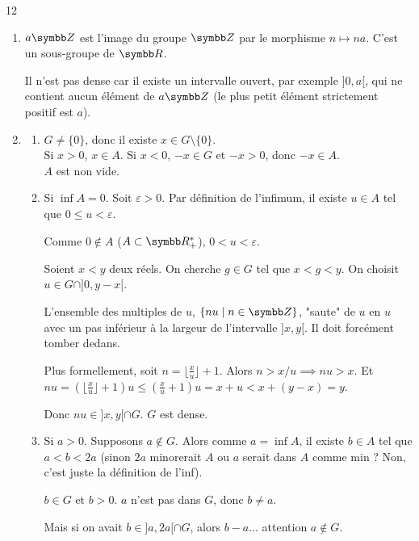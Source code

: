 \begin{correction}{12}
\begin{enumerate}
    \item $a\Z$ est l'image du groupe $\Z$ par le morphisme $n \mapsto na$. C'est un sous-groupe de $\R$.
    
        Il n'est pas dense car il existe un intervalle ouvert, par exemple $]0, a[$, 
        qui ne contient aucun élément de $a\Z$ (le plus petit élément strictement positif est $a$).

    \item
    \begin{enumerate}
        \item $G \neq \{0\}$, donc il existe $x \in G \setminus \{0\}$. \\
            Si $x > 0$, $x \in A$.
            Si $x < 0$, $-x \in G$ et $-x > 0$, donc $-x \in A$. \\
            $A$ est non vide.

        \item Si $\inf A = 0$. Soit $\varepsilon > 0$. Par définition de l'infimum, il existe $u \in A$ tel que $0 \le u < \varepsilon$. 
        
            Comme $0 \notin A$ ($A \subset \R^*_+$), $0 < u < \varepsilon$.

            Soient $x < y$ deux réels. On cherche $g \in G$ tel que $x < g < y$.
            On choisit $u \in G \cap ]0, y-x[$.

            L'ensemble des multiples de $u$, $\{nu \mid n \in \Z\}$, 
            "saute" de $u$ en $u$ avec un pas inférieur à la largeur de l'intervalle $]x,y[$. 
            Il doit forcément tomber dedans.

            Plus formellement, soit $n = \lfloor \frac{x}{u} \rfloor + 1$. Alors $n > x/u \implies nu > x$.
            Et $nu = (\lfloor \frac{x}{u} \rfloor + 1) u \le (\frac{x}{u} + 1)u = x + u < x + (y-x) = y$.

            Donc $nu \in ]x,y[ \cap G$. $G$ est dense.

        \item Si $a > 0$. Supposons $a \notin G$. Alors comme $a = \inf A$, il existe $b \in A$ tel que $a < b < 2a$
            (sinon $2a$ minorerait $A$ ou $a$ serait dans $A$ comme min ? Non, c'est juste la définition de l'inf).

            $b \in G$ et $b > 0$. $a$ n'est pas dans $G$, donc $b \neq a$.

            Mais si on avait $b \in ]a, 2a[ \cap G$, alors $b-a$... attention $a \notin G$.


\end{enumerate}
\end{enumerate}
\end{correction}
